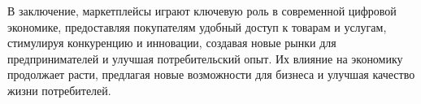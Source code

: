 В заключение, маркетплейсы играют ключевую роль в современной цифровой экономике, предоставляя покупателям удобный доступ к товарам и услугам, стимулируя конкуренцию и инновации, создавая новые рынки для предпринимателей и улучшая потребительский опыт. Их влияние на экономику продолжает расти, предлагая новые возможности для бизнеса и улучшая качество жизни потребителей.




